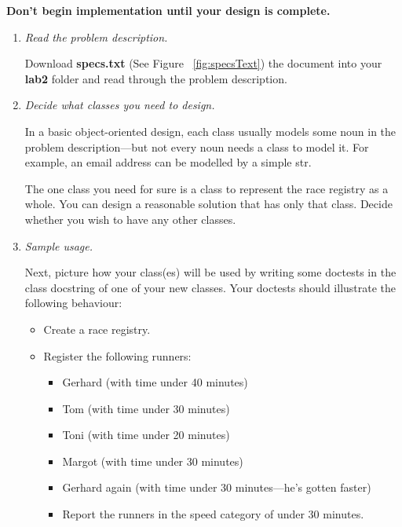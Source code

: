 \documentclass[12pt]{article}
\begin{document}
\bigskip

\textbf{Don’t begin implementation until your design is complete.}

\begin{enumerate}[1.]
\item \textit{Read the problem description.}

Download \textbf{specs.txt} (See Figure ~\ref{fig:specsText}) the document into your \textbf{lab2} folder and read
through the problem description.

\item \textit{Decide what classes you need to design.}

In a basic object-oriented design, each class usually models some noun in the
problem description—but not every noun needs a class to model it. For example,
an email address can be modelled by a simple str.

\bigskip

The one class you need for sure is a class to represent the race registry as a
whole. You can design a reasonable solution that has only that class. Decide
 whether you wish to have any other classes.

\item \textit{Sample usage.}

Next, picture how your class(es) will be used by writing some doctests in the class
docstring of one of your new classes. Your doctests should illustrate the following
behaviour:

\begin{itemize}
    \item Create a race registry.
    \item Register the following runners:
    \begin{itemize}
        \item Gerhard (with time under 40 minutes)
        \item Tom (with time under 30 minutes)
        \item Toni (with time under 20 minutes)
        \item Margot (with time under 30 minutes)
        \item Gerhard again (with time under 30 minutes—he’s gotten faster)
        \item Report the runners in the speed category of under 30 minutes.
    \end{itemize}
\end{itemize}

\bigskip


\end{enumerate}
\end{document}
